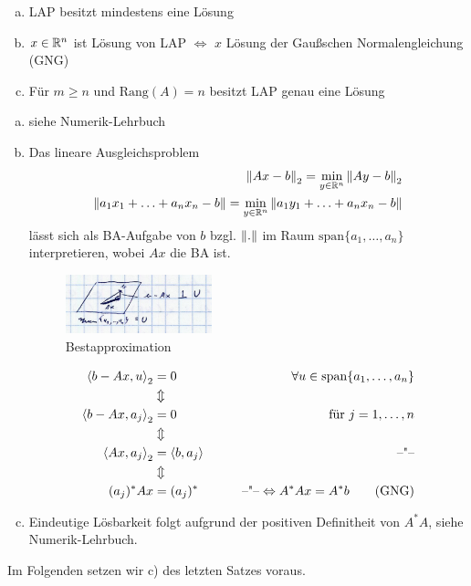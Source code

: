 \begin{enumerate}[a)]
  \item LAP besitzt mindestens eine Lösung
  \item $x \in \mathbb{R}^{n}$ ist Lösung von LAP $\Leftrightarrow$ $x$ Lösung der Gaußschen Normalengleichung (GNG)
  \item Für $m \geq n$ und $\mathrm{Rang}(A) = n$ besitzt LAP genau eine Lösung

\end{enumerate}
\beweis
\begin{enumerate}[a)]
  \item siehe Numerik-Lehrbuch
  \item{Das lineare Ausgleichsproblem \begin{align*}
    \left\lVert Ax-b \right\rVert_2 = \underset{y \in \mathbb{R}^{n}}{\min} \left\lVert Ay - b \right\rVert_2\\
    \left\lVert a_1 x_1 + \ldots + a_n x_n - b \right\rVert = \underset{y \in \mathbb{R}^{n}}{\min} \left\lVert a_1 y_1 + \ldots + a_n x_n - b \right\rVert
    \end{align*} lässt sich als BA-Aufgabe von $b$ bzgl. $\left\lVert . \right\rVert$ im Raum $\mathrm{span}\{a_1, \ldots, a_n\}$ interpretieren,
    wobei $Ax$ die BA ist.
    \begin{figure}
      \centering
      \includegraphics[width=0.4\textwidth]{figures/ausgleichsrechnung_ba.png}
      \caption{Bestapproximation}
    \end{figure}
    \begin{align*}
      \left\langle b - Ax, u \right\rangle_2 &= 0 \qquad & \forall u \in \mathrm{span}\{a_1,\ldots, a_n\}\\
      &\Updownarrow\\
      \left\langle b - Ax, a_j \right\rangle_2 &= 0 & \text{für } j=1,\ldots,n\\
      &\Updownarrow\\
      \left\langle Ax, a_j \right\rangle_2 &= \left\langle b, a_j \right\rangle \qquad & \text{--"--}\\
      &\Updownarrow\\
      (a_j)^* Ax &= (a_j)^* \qquad & \text{--"--} \Leftrightarrow A^*Ax = A^* b \tag{GNG}
    \end{align*}}
  \item Eindeutige Lösbarkeit folgt aufgrund der positiven Definitheit von $A^*A$, siehe Numerik-Lehrbuch.
\end{enumerate}
Im Folgenden setzen wir c) des letzten Satzes voraus.

